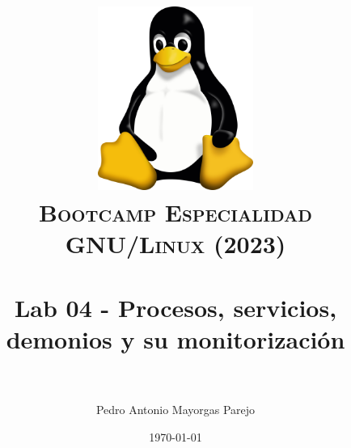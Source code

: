 

\graphicspath{ {img/} }

\title{
\normalfont \normalsize
\includegraphics[width=6cm,height=6cm]{logo}\\
\textsc{\textbf{Bootcamp Especialidad GNU/Linux (2023)}} \\ [25pt] %
\horrule{0.5pt} \\[0.4cm] %
\huge Lab 04 - Procesos, servicios, demonios y su monitorización \\ %
\horrule{2pt} \\[0.5cm] %
}



\author{Pedro Antonio Mayorgas Parejo} %

\date{\normalsize\today} %




\maketitle %

\newpage %

\tableofcontents %

\newpage

